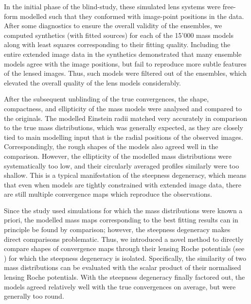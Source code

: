 In the initial phase of the blind-study, these simulated lens systems were
free-form modelled such that they conformed with image-point positions in the
data.  After some diagnostics to ensure the overall validity of the ensembles,
we computed synthetics (with fitted sources) for each of the 15'000 mass models
along with least squares corresponding to their fitting quality.  Including the
entire extended image data in the synthetics demonstrated that many ensemble
models agree with the image positions, but fail to reproduce more subtle
features of the lensed images.  Thus, such models were filtered out of the
ensembles, which elevated the overall quality of the lens models considerably.

After the subsequent unblinding of the true convergences, the shape,
compactness, and ellipticity of the mass models were analysed and compared to
the originals.  The modelled Einstein radii matched very accurately in comparison to the true mass distributions,
which was generally expected, as they are closely tied to main modelling input
that is the radial positions of the observed images. Correspondingly, the rough
shapes of the models also agreed well in the comparison.  However, the
ellipticity of the modelled mass distributions were systematically too low, and
their circularly averaged profiles similarly were too shallow.  This is a
typical manifestation of the steepness degeneracy, which means that even when
models are tightly constrained with extended image data, there are still
multiple convergence maps which reproduce the observations.

Since the study used simulations for which the mass distributions were known a
priori, the modelled mass maps corresponding to the best fitting results can in
principle be found by comparison; however, the steepness degeneracy makes direct
comparisons problematic.  Thus, we introduced a novel method to directly compare
shapes of convergence maps through their lensing Roche potentials (see
) for which the steepness degeneracy is isolated.
Specifically, the similarity of two mass distributions can be evaluated with the
scalar product of their normalised lensing Roche potentials.  With the steepness
degeneracy finally factored out, the models agreed relatively well with the true
convergences on average, but were generally too round.

